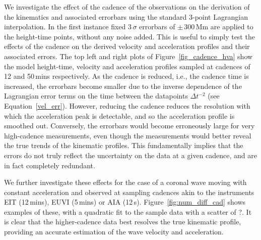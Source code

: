 \documentclass[structabstract]{aa}
\begin{document}
We investigate the effect of the cadence of the observations on the derivation of the kinematics and associated errorbars using the standard 3-point Lagrangian interpolation. In the first instance fixed 3\,$\sigma$ errorbars of $\pm$\,300\,Mm are applied to the height-time points, without any noise added. This is useful to simply test the effects of the cadence on the derived velocity and acceleration profiles and their associated errors. The top left and right plots of Figure~\ref{fig_cadence_hva} show the model height-time, velocity and acceleration profiles sampled at cadences of 12 and 50\,mins respectively. As the cadence is reduced, i.e., the cadence time is increased, the errorbars become smaller due to the inverse dependence of the Lagrangian error terms on the time between the datapoints $\Delta t^{-2}$ (see Equation~\ref{vel_err}). However, reducing the cadence reduces the resolution with which the acceleration peak is detectable, and so the acceleration profile is smoothed out. Conversely, the errorbars would become erroneously large for very high-cadence measurements, even though the measurements would better reveal the true trends of the kinematic profiles. This fundamentally implies that the errors do not truly reflect the uncertainty on the data at a given cadence, and are in fact completely redundant.

We further investigate these effects for the case of a coronal wave moving with constant acceleration and observed at sampling cadences akin to the instruments EIT (12\,mins), EUVI (5\,mins) or AIA (12\,s). Figure~\ref{fig:num_diff_cad} shows examples of these, with a quadratic fit to the sample data with a scatter of ?. It is clear that the higher-cadence data best resolves the true kinematic profile, providing an accurate estimation of the wave velocity and acceleration.
\end{document}
